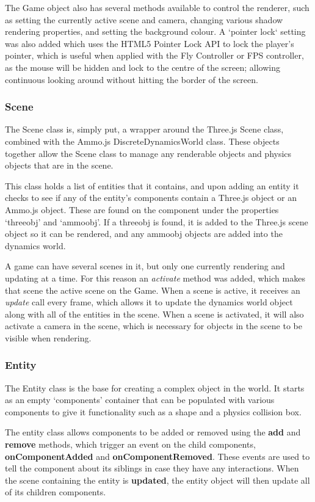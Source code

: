 	The Game object also has several methods available to control the renderer, such as setting the currently active scene and camera, changing various shadow rendering properties, and setting the background colour. A `pointer lock` setting was also added which uses the HTML5 Pointer Lock API to lock the player's pointer, which is useful when applied with the Fly Controller or FPS controller, as the mouse will be hidden and lock to the centre of the screen; allowing continuous looking around without hitting the border of the screen.\cite{pointerlock}

	\subsubsection{Scene}
	The Scene class is, simply put, a wrapper around the Three.js Scene class, combined with the Ammo.js DiscreteDynamicsWorld class. These objects together allow the Scene class to manage any renderable objects and physics objects that are in the scene.

	This class holds a list of entities that it contains, and upon adding an entity it checks to see if any of the entity's components contain a Three.js object or an Ammo.js object. These are found on the component under the properties `threeobj' and `ammoobj'. If a threeobj is found, it is added to the Three.js scene object so it can be rendered, and any ammoobj objects are added into the dynamics world.

	A game can have several scenes in it, but only one currently rendering and updating at a time. For this reason an \emph{activate} method was added, which makes that scene the active scene on the Game. When a scene is active, it receives an \emph{update} call every frame, which allows it to update the dynamics world object along with all of the entities in the scene. When a scene is activated, it will also activate a camera in the scene, which is necessary for objects in the scene to be visible when rendering.

	\subsubsection{Entity}
	The Entity class is the base for creating a complex object in the world. It starts as an empty `components' container that can be populated with various components to give it functionality such as a shape and a physics collision box. 

	The entity class allows components to be added or removed using the \textbf{add} and \textbf{remove} methods, which trigger an event on the child components, \textbf{onComponentAdded} and \textbf{onComponentRemoved}. These events are used to tell the component about its siblings in case they have any interactions. When the scene containing the entity is \textbf{updated}, the entity object will then update all of its children components.

